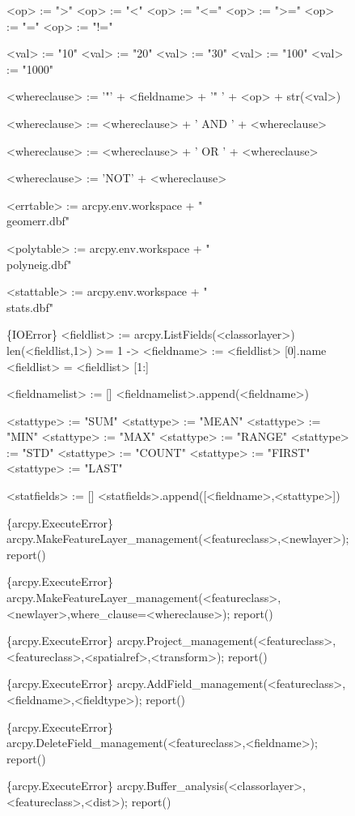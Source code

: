 \begin{figure}
{\scriptsize
\begin{code}
<op> := ">"
<op> := "<"
<op> := "<="
<op> := ">="
<op> := "="
<op> := "!="

<val> := "10"
<val> := "20"
<val> := "30"
<val> := "100"
<val> := "1000"

<whereclause> := '"' + <fieldname> + '" ' + <op> + str(<val>)

<whereclause> := <whereclause> + ' AND ' + <whereclause>

<whereclause> := <whereclause> + ' OR ' +  <whereclause>

<whereclause> := 'NOT' + <whereclause>

<errtable> := arcpy.env.workspace + "\\geomerr.dbf"

<polytable> := arcpy.env.workspace + "\\polyneig.dbf"

<stattable> := arcpy.env.workspace + "\\stats.dbf"

\{IOError\} <fieldlist> := arcpy.ListFields(<classorlayer>)
len(<fieldlist,1>) >= 1 -> <fieldname> := <fieldlist> [0].name
<fieldlist> = <fieldlist> [1:]

<fieldnamelist> := []
<fieldnamelist>.append(<fieldname>)

<stattype> := "SUM"
<stattype> := "MEAN"
<stattype> := "MIN"
<stattype> := "MAX"
<stattype> := "RANGE"
<stattype> := "STD"
<stattype> := "COUNT"
<stattype> := "FIRST"
<stattype> := "LAST"

<statfields> := []
<statfields>.append([<fieldname>,<stattype>])

\{arcpy.ExecuteError\} arcpy.MakeFeatureLayer\_management(<featureclass>,<newlayer>); report()

\{arcpy.ExecuteError\} arcpy.MakeFeatureLayer\_management(<featureclass>,<newlayer>,where\_clause=<whereclause>); report()

\{arcpy.ExecuteError\} arcpy.Project\_management(<featureclass>,<featureclass>,<spatialref>,<transform>); report()

\{arcpy.ExecuteError\} arcpy.AddField\_management(<featureclass>,<fieldname>,<fieldtype>); report()

\{arcpy.ExecuteError\} arcpy.DeleteField\_management(<featureclass>,<fieldname>); report()

\{arcpy.ExecuteError\} arcpy.Buffer\_analysis(<classorlayer>,<featureclass>,<dist>); report()


\end{code}}
\end{figure}
